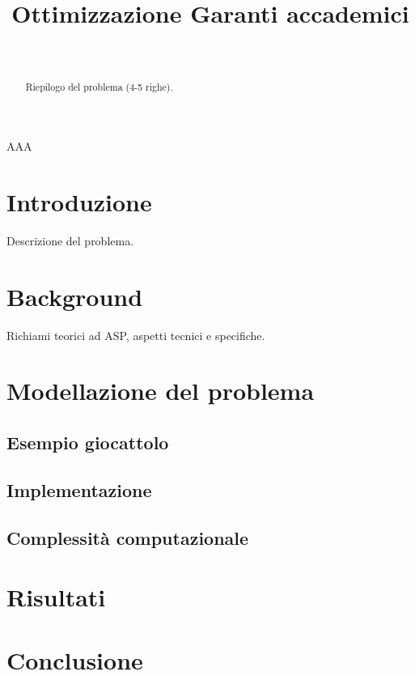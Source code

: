 \documentclass[draft, journal, onecolumn]{IEEEtran}
\begin{document}
\title{Ottimizzazione Garanti accademici}

\author{
\\
\and
{}
}

\maketitle

\begin{abstract}
	Riepilogo del problema (4-5 righe).
\end{abstract}

\begin{IEEEkeywords}
AAA
\end{IEEEkeywords}

\section{Introduzione}
Descrizione del problema.

\section{Background}
Richiami teorici ad ASP, aspetti tecnici e specifiche.

\section{Modellazione del problema}
\subsection{Esempio giocattolo}
\subsection{Implementazione}
\subsection{Complessità computazionale}

\section{Risultati}

\section{Conclusione}
\end{document}
